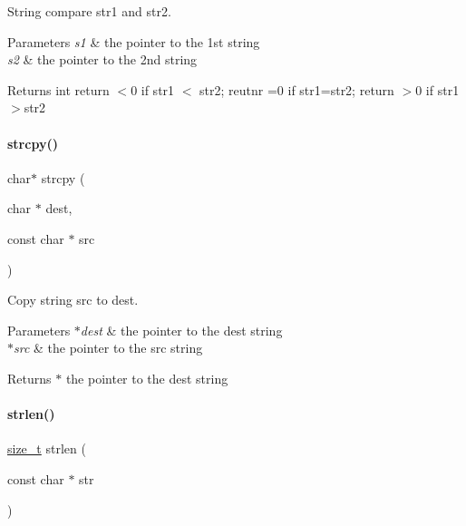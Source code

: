 String compare str1 and str2. 


\begin{DoxyParams}{Parameters}
{\em s1} & the pointer to the 1st string \\
\hline
{\em s2} & the pointer to the 2nd string \\
\hline
\end{DoxyParams}
\begin{DoxyReturn}{Returns}
int return $<$0 if str1 $<$ str2; reutnr =0 if str1=str2; return $>$0 if str1$>$str2 
\end{DoxyReturn}
\mbox{\label{a00038_a7a82515b5d377be04817715c5465b647}} 
\paragraph{\texorpdfstring{strcpy()}{strcpy()}}
{\footnotesize\ttfamily char$\ast$ strcpy (\begin{DoxyParamCaption}\item[{char $\ast$}]{dest,  }\item[{const char $\ast$}]{src }\end{DoxyParamCaption})}



Copy string src to dest. 


\begin{DoxyParams}{Parameters}
{\em $\ast$dest} & the pointer to the dest string \\
\hline
{\em $\ast$src} & the pointer to the src string \\
\hline
\end{DoxyParams}
\begin{DoxyReturn}{Returns}
$\ast$ the pointer to the dest string 
\end{DoxyReturn}
\mbox{\label{a00038_a008e171a518fe0e0352f31b245e03875}} 
\paragraph{\texorpdfstring{strlen()}{strlen()}}
{\footnotesize\ttfamily \mbox{\hyperlink{a00038_a43b4547e12226fef871eed8afe191ad7}{size\+\_\+t}} strlen (\begin{DoxyParamCaption}\item[{const char $\ast$}]{str }\end{DoxyParamCaption})}



